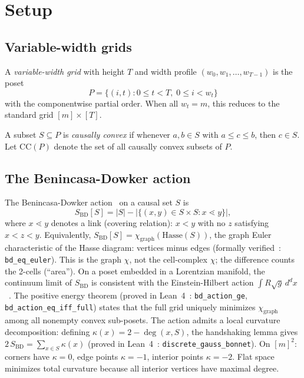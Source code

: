 \documentclass[aps,prd,twocolumn,superscriptaddress]{revtex4-2}
\begin{document}
\section{Setup}

\subsection{Variable-width grids}

A \emph{variable-width grid} with height $T$ and width profile
$(w_0, w_1, \ldots, w_{T-1})$ is the poset
\[
P = \{(i, t) : 0 \leq t < T,\; 0 \leq i < w_t\}
\]
with the componentwise partial order. When all $w_t = m$, this
reduces to the standard grid $[m] \times [T]$.

A subset $S \subseteq P$ is \emph{causally convex} if whenever
$a, b \in S$ with $a \leq c \leq b$, then $c \in S$. Let
$\mathrm{CC}(P)$ denote the set of all causally convex subsets
of $P$.

\subsection{The Benincasa-Dowker action}

The Benincasa-Dowker action~\cite{BenincasaDowker} on a causal set
$S$ is
\begin{equation}
\label{eq:BD}
S_{\mathrm{BD}}[S] = |S| - |\{(x,y) \in S \times S : x \lessdot y\}|,
\end{equation}
where $x \lessdot y$ denotes a link (covering relation): $x < y$
with no $z$ satisfying $x < z < y$.
Equivalently, $S_{\mathrm{BD}}[S] = \chi_{\mathrm{graph}}(\mathrm{Hasse}(S))$, the
graph Euler characteristic of the Hasse diagram: vertices minus edges
(formally verified~\cite{leanrepo}: \texttt{bd\_eq\_euler}).
This is the graph $\chi$, not the cell-complex $\chi$; the
difference counts the 2-cells (``area'').
On a poset embedded in a
Lorentzian manifold, the continuum limit of $S_{\mathrm{BD}}$
is consistent with the Einstein-Hilbert action $\int R \sqrt{g}\,
d^dx$~\cite{BenincasaDowker,Surya2019}.
The positive energy theorem (proved in Lean~4~\cite{leanrepo}:
\texttt{bd\_action\_ge}, \texttt{bd\_action\_eq\_iff\_full}) states that the
full grid uniquely minimizes $\chi_{\mathrm{graph}}$ among all nonempty convex
sub-posets. The action admits a local curvature decomposition:
defining $\kappa(x) = 2 - \deg(x, S)$, the handshaking lemma gives
$2\, S_{\mathrm{BD}} = \sum_{x \in S} \kappa(x)$
(proved in Lean~4~\cite{leanrepo}: \texttt{discrete\_gauss\_bonnet}).
On $[m]^2$: corners have $\kappa = 0$, edge points $\kappa = -1$,
interior points $\kappa = -2$. Flat space minimizes total curvature
because all interior vertices have maximal degree.
\end{document}

